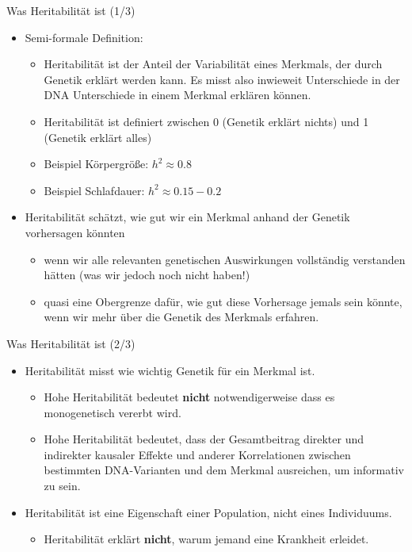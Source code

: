 \documentclass{beamer}
\begin{document}
\begin{frame}{Was Heritabilität ist (1/3)}
    \begin{itemize}
        \item Semi-formale Definition:
        \begin{itemize}
            \item Heritabilität ist der Anteil der Variabilität eines Merkmals, der durch Genetik erklärt werden kann. Es misst also inwieweit Unterschiede in der DNA Unterschiede in einem Merkmal erklären können.
            \item Heritabilität ist definiert zwischen 0 (Genetik erklärt nichts) und 1 (Genetik erklärt alles) 
            \item Beispiel Körpergröße: $h^2 \approx 0.8$ 
            \item Beispiel Schlafdauer: $h^2 \approx 0.15-0.2$
        \end{itemize}
        \item Heritabilität schätzt, wie gut wir ein Merkmal anhand der Genetik vorhersagen könnten
        \begin{itemize}
            \item wenn wir alle relevanten genetischen Auswirkungen vollständig verstanden hätten (was wir jedoch noch nicht haben!)
            \item quasi eine Obergrenze dafür, wie gut diese Vorhersage jemals sein könnte, wenn wir mehr über die Genetik des Merkmals erfahren.
        \end{itemize}
    \end{itemize}
\end{frame}

\begin{frame}{Was Heritabilität ist (2/3)}
    \begin{itemize}
        \item Heritabilität misst wie wichtig Genetik für ein Merkmal ist. 
        \begin{itemize}
            \item Hohe Heritabilität bedeutet \textbf{nicht} notwendigerweise dass es monogenetisch vererbt wird. 
            \item Hohe Heritabilität bedeutet, dass der Gesamtbeitrag direkter und indirekter kausaler Effekte und anderer Korrelationen zwischen bestimmten DNA-Varianten und dem Merkmal ausreichen, um informativ zu sein.
        \end{itemize}
        \item Heritabilität ist eine Eigenschaft einer Population, nicht eines Individuums.
        \begin{itemize}
            \item Heritabilität erklärt \textbf{nicht}, warum jemand eine Krankheit erleidet.
        \end{itemize}
    \end{itemize}
\end{frame}
\end{document}
